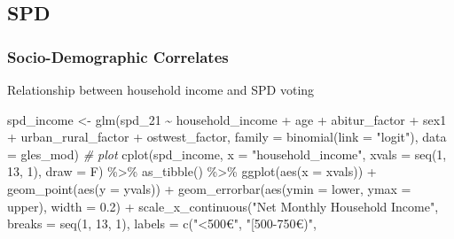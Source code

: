 \documentclass[
]{article}
\newenvironment{Shaded}{\begin{snugshade}}{\end{snugshade}}
\newcommand{\AttributeTok}[1]{\textcolor[rgb]{0.77,0.63,0.00}{#1}}
\newcommand{\CommentTok}[1]{\textcolor[rgb]{0.56,0.35,0.01}{\textit{#1}}}
\newcommand{\DecValTok}[1]{\textcolor[rgb]{0.00,0.00,0.81}{#1}}
\newcommand{\FloatTok}[1]{\textcolor[rgb]{0.00,0.00,0.81}{#1}}
\newcommand{\FunctionTok}[1]{\textcolor[rgb]{0.00,0.00,0.00}{#1}}
\newcommand{\NormalTok}[1]{#1}
\newcommand{\OtherTok}[1]{\textcolor[rgb]{0.56,0.35,0.01}{#1}}
\newcommand{\SpecialCharTok}[1]{\textcolor[rgb]{0.00,0.00,0.00}{#1}}
\newcommand{\StringTok}[1]{\textcolor[rgb]{0.31,0.60,0.02}{#1}}
\begin{document}
\hypertarget{spd}{%
\subsection{SPD}\label{spd}}

\hypertarget{socio-demographic-correlates}{%
\subsubsection{Socio-Demographic
Correlates}\label{socio-demographic-correlates}}

Relationship between household income and SPD voting

\begin{Shaded}
\begin{Highlighting}[]
\NormalTok{spd\_income }\OtherTok{\textless{}{-}} \FunctionTok{glm}\NormalTok{(spd\_21 }\SpecialCharTok{\textasciitilde{}}\NormalTok{ household\_income }\SpecialCharTok{+}\NormalTok{ age }\SpecialCharTok{+}\NormalTok{ abitur\_factor }\SpecialCharTok{+}\NormalTok{ sex1 }\SpecialCharTok{+}\NormalTok{ urban\_rural\_factor }\SpecialCharTok{+}\NormalTok{ ostwest\_factor, }\AttributeTok{family =} \FunctionTok{binomial}\NormalTok{(}\AttributeTok{link =} \StringTok{"logit"}\NormalTok{), }\AttributeTok{data =}\NormalTok{ gles\_mod)}
\CommentTok{\# plot }
\FunctionTok{cplot}\NormalTok{(spd\_income, }\AttributeTok{x =} \StringTok{"household\_income"}\NormalTok{,}
      \AttributeTok{xvals =} \FunctionTok{seq}\NormalTok{(}\DecValTok{1}\NormalTok{, }\DecValTok{13}\NormalTok{, }\DecValTok{1}\NormalTok{), }\AttributeTok{draw =}\NormalTok{ F) }\SpecialCharTok{\%\textgreater{}\%}
  \FunctionTok{as\_tibble}\NormalTok{() }\SpecialCharTok{\%\textgreater{}\%}
  \FunctionTok{ggplot}\NormalTok{(}\FunctionTok{aes}\NormalTok{(}\AttributeTok{x =}\NormalTok{ xvals)) }\SpecialCharTok{+}
  \FunctionTok{geom\_point}\NormalTok{(}\FunctionTok{aes}\NormalTok{(}\AttributeTok{y =}\NormalTok{ yvals)) }\SpecialCharTok{+}
  \FunctionTok{geom\_errorbar}\NormalTok{(}\FunctionTok{aes}\NormalTok{(}\AttributeTok{ymin =}\NormalTok{ lower, }\AttributeTok{ymax =}\NormalTok{ upper), }\AttributeTok{width =} \FloatTok{0.2}\NormalTok{) }\SpecialCharTok{+}
  \FunctionTok{scale\_x\_continuous}\NormalTok{(}\StringTok{"Net Monthly Household Income"}\NormalTok{,}
                     \AttributeTok{breaks =} \FunctionTok{seq}\NormalTok{(}\DecValTok{1}\NormalTok{, }\DecValTok{13}\NormalTok{, }\DecValTok{1}\NormalTok{),}
                     \AttributeTok{labels =} \FunctionTok{c}\NormalTok{(}\StringTok{"\textless{}500€"}\NormalTok{, }\StringTok{"[500{-}750€)"}\NormalTok{,}

\end{Highlighting}
\end{Shaded}
\end{document}
